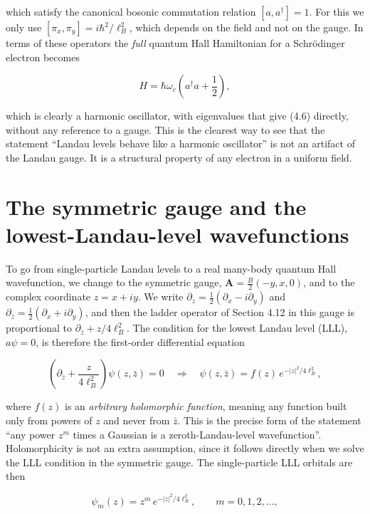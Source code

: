 which satisfy the canonical bosonic commutation relation $[a,a^\dagger]=1$. For this we only use
$[\pi_x,\pi_y]=i\hbar^2/\ell_B^2$, which depends on the field and not on the gauge. In terms of these operators the \emph{full} quantum Hall Hamiltonian for a
Schrödinger electron becomes

\begin{equation}
H = \hbar\omega_c\left(a^\dagger a + \frac{1}{2}\right),
\end{equation}

which is clearly a harmonic oscillator, with eigenvalues that give (4.6) directly, without any
reference to a gauge. This is the clearest way to see that the statement ``Landau levels behave
like a harmonic oscillator'' is not an artifact of the Landau gauge. It is a structural property
of any electron in a uniform field.

\section{The symmetric gauge and the lowest-Landau-level wavefunctions}

To go from single-particle Landau levels to a real many-body quantum Hall wavefunction, we change
to the symmetric gauge, $\mathbf{A}=\tfrac{B}{2}(-y,x,0)$, and to the complex coordinate $z=x+iy$.
We write $\partial_z = \tfrac12(\partial_x-i\partial_y)$ and $\partial_{\bar z} =
\tfrac12(\partial_x+i\partial_y)$, and then the ladder operator of Section 4.12 in this gauge is
proportional to $\partial_{\bar z} + z/4\ell_B^2$. The condition for the lowest Landau level (LLL),
$a\psi=0$, is therefore the first-order differential equation

\begin{equation}
\left(\partial_{\bar z} + \frac{z}{4\ell_B^2}\right)\psi(z,\bar z) = 0
\quad\Longrightarrow\quad
\psi(z,\bar z) = f(z)\, e^{-|z|^2/4\ell_B^2},
\end{equation}

where $f(z)$ is an \emph{arbitrary holomorphic function}, meaning any function built only from
powers of $z$ and never from $\bar z$. This is the precise form of the statement ``any power $z^m$
times a Gaussian is a zeroth-Landau-level wavefunction''. Holomorphicity is not an extra
assumption, since it follows directly when we solve the LLL condition in the symmetric gauge. The
single-particle LLL orbitals are then

\begin{equation}
\psi_m(z) = z^m\, e^{-|z|^2/4\ell_B^2}, \qquad m=0,1,2,\dots,
\end{equation}

